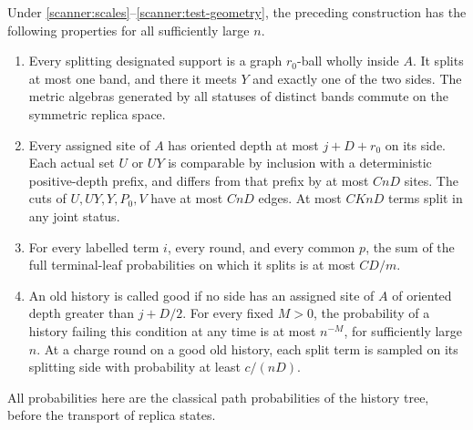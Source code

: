 \begin{lemma}
\label{scanner:histories}
Under \eqref{scanner:scales}--\eqref{scanner:test-geometry}, the preceding
construction has the following properties for all sufficiently large \(n\).
\begin{enumerate}
\item Every splitting designated support is a graph \(r_0\)-ball wholly
inside \(A\).  It splits at most one band, and there it meets \(Y\)
and exactly one of the two sides.  The metric algebras generated by all
statuses of distinct bands commute on the symmetric replica space.
\item Every assigned site of \(A\) has oriented depth at most \(j+D+r_0\) on
its side.  Each actual set \(U\) or \(UY\) is comparable by inclusion
with a deterministic positive-depth prefix, and differs from that prefix
by at most \(CnD\) sites.  The cuts of \(U,UY,Y,P_0,V\) have at most
\(CnD\) edges.  At most \(CKnD\) terms split in any joint status.
\item For every labelled term \(i\), every round, and every common
\(p\), the sum of the full terminal-leaf probabilities on which it
splits is at most \(CD/m\).
\item An old history is called good if no side has an assigned site of \(A\) of
oriented depth greater than \(j+D/2\).  For every fixed \(M>0\), the
probability of a history failing this condition at any time is at most
\(n^{-M}\), for sufficiently large \(n\).  At a charge round on a good
old history, each split term is sampled on its splitting side with
probability at least \(c/(nD)\).
\end{enumerate}
All probabilities here are the classical path probabilities of the
history tree, before the transport of replica states.
\end{lemma}

